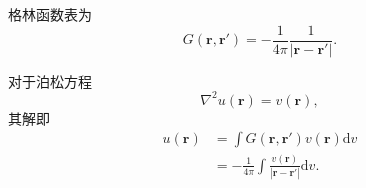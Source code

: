 格林函数表为
\begin{equation}
    G(\bm{r},\bm{r}')=-\frac{1}{4\pi}\frac{1}{|\bm{r}-\bm{r}'|}.
\end{equation}

对于泊松方程
\begin{equation}
    \nabla^2 u(\bm{r})=v(\bm{r}),
\end{equation}
其解即
\begin{equation}
    \begin{aligned}
        u(\bm{r}) & =\int G(\bm{r},\bm{r}')v(\bm{r})\mathrm{d}v                        \\
                  & =-\frac{1}{4\pi}\int\frac{v(\bm{r})}{|\bm{r}-\bm{r}'|}\mathrm{d}v.
    \end{aligned}
\end{equation}
